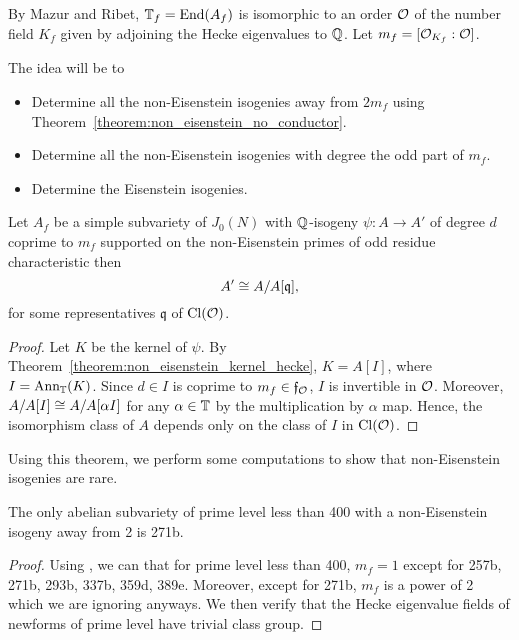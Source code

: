 \documentclass{article}
\begin{document}
By Mazur and Ribet, $\mathbb{T}_f=\operatorname{End}(A_f)$ is isomorphic to an order $\mathcal{O}$ of the
number field $K_f$ given by adjoining the Hecke eigenvalues to $\mathbb{Q}$. Let
$m_f=[\mathcal{O}_{K_f}:\mathcal{O}]$. 

The idea will be to
\begin{itemize}
    \item 
        Determine all the non-Eisenstein isogenies away from $2m_f$ using
        Theorem~\ref{theorem:non_eisenstein_no_conductor}.
    \item
        Determine all the non-Eisenstein isogenies with degree the odd part of
        $m_f$.
    \item
        Determine the Eisenstein isogenies.
\end{itemize}

\begin{theorem}\label{theorem:non_eisenstein_no_conductor}
    Let $A_f$ be a simple subvariety of $J_0(N)$ with $\mathbb{Q}$-isogeny $\psi:A\to
    A'$ of degree $d$ coprime to $m_f$ supported on the non-Eisenstein primes
    of odd residue characteristic then
    \[
        A' \cong A/A[\mathfrak{q}],
    \]
    for some representatives $\mathfrak{q}$ of $\operatorname{Cl}(\mathcal{O})$.
\end{theorem}
\begin{proof}
    Let $K$ be the kernel of $\psi$. By
    Theorem~\ref{theorem:non_eisenstein_kernel_hecke}, $K=A[I]$, where
    $I=\operatorname{Ann}_{\mathbb{T}}(K)$. Since $d\in I$ is coprime to $m_f\in \mathfrak{f}_{\mathcal{O}}$,
    $I$ is invertible in $\mathcal{O}$. Moreover, $A/A[I]\cong A/A[\alpha I]$ for any
    $\alpha\in \mathbb{T}$ by the multiplication by $\alpha$ map. Hence, the
    isomorphism class of $A$ depends only on the class of $I$ in $\operatorname{Cl}(\mathcal{O})$.
\end{proof}

Using this theorem, we perform some computations to show that non-Eisenstein
isogenies are rare.
\begin{proposition}
    The only abelian subvariety of prime level less than 400 with a
    non-Eisenstein isogeny away from 2 is 271b.
\end{proposition}
\begin{proof}
    Using \sage, we can that for prime level less than 400, $m_f=1$ except for
    257b, 271b, 293b, 337b, 359d, 389e. Moreover, except for 271b, $m_f$ is a
    power of 2 which we are ignoring anyways. We then verify that the Hecke
    eigenvalue fields of newforms of prime level have trivial class group.
\end{proof}
\end{document}
